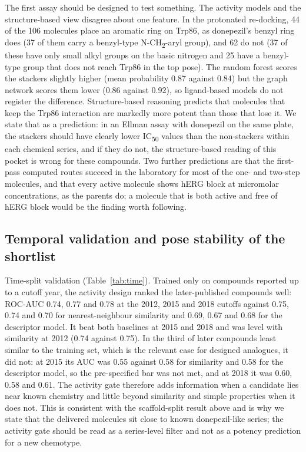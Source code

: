 \documentclass[11pt,a4paper]{article}
\begin{document}
The first assay should be designed to test something. The activity models and the structure-based view disagree about one feature. In the protonated re-docking, 44 of the 106 molecules place an aromatic ring on Trp86, as donepezil's benzyl ring does (37 of them carry a benzyl-type N-CH\textsubscript{2}-aryl group), and 62 do not (37 of these have only small alkyl groups on the basic nitrogen and 25 have a benzyl-type group that does not reach Trp86 in the top pose). The random forest scores the stackers slightly higher (mean probability 0.87 against 0.84) but the graph network scores them lower (0.86 against 0.92), so ligand-based models do not register the difference. Structure-based reasoning predicts that molecules that keep the Trp86 interaction are markedly more potent than those that lose it. We state that as a prediction: in an Ellman assay with donepezil on the same plate, the stackers should have clearly lower IC\textsubscript{50} values than the non-stackers within each chemical series, and if they do not, the structure-based reading of this pocket is wrong for these compounds. Two further predictions are that the first-pass computed routes succeed in the laboratory for most of the one- and two-step molecules, and that every active molecule shows hERG block at micromolar concentrations, as the parents do; a molecule that is both active and free of hERG block would be the finding worth following.

\subsection{Temporal validation and pose stability of the shortlist}
\label{sec:timeresults}

Time-split validation (Table~\ref{tab:time}). Trained only on compounds reported up to a cutoff year, the activity design ranked the later-published compounds well: ROC-AUC 0.74, 0.77 and 0.78 at the 2012, 2015 and 2018 cutoffs against 0.75, 0.74 and 0.70 for nearest-neighbour similarity and 0.69, 0.67 and 0.68 for the descriptor model. It beat both baselines at 2015 and 2018 and was level with similarity at 2012 (0.74 against 0.75). In the third of later compounds least similar to the training set, which is the relevant case for designed analogues, it did not: at 2015 its AUC was 0.55 against 0.58 for similarity and 0.58 for the descriptor model, so the pre-specified bar was not met, and at 2018 it was 0.60, 0.58 and 0.61. The activity gate therefore adds information when a candidate lies near known chemistry and little beyond similarity and simple properties when it does not. This is consistent with the scaffold-split result above and is why we state that the delivered molecules sit close to known donepezil-like series; the activity gate should be read as a series-level filter and not as a potency prediction for a new chemotype.
\end{document}
